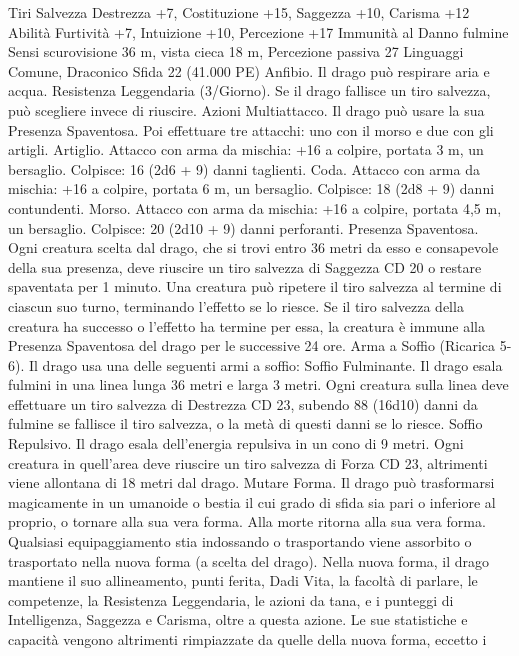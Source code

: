 \begin{multicols}{2}
Tiri Salvezza Destrezza +7, Costituzione +15, Saggezza +10,
Carisma +12
Abilità Furtività +7, Intuizione +10, Percezione +17
Immunità al Danno fulmine
Sensi scurovisione 36 m, vista cieca 18 m, Percezione passiva 27
Linguaggi Comune, Draconico
Sfida 22 (41.000 PE)
Anfibio. Il drago può respirare aria e acqua.
Resistenza Leggendaria (3/Giorno). Se il drago fallisce un tiro
salvezza, può scegliere invece di riuscire.
Azioni
Multiattacco. Il drago può usare la sua Presenza Spaventosa. Poi
effettuare tre attacchi: uno con il morso e due con gli artigli.
Artiglio. Attacco con arma da mischia: +16 a colpire, portata 3
m, un bersaglio.
Colpisce: 16 (2d6 + 9) danni taglienti.
Coda. Attacco con arma da mischia: +16 a colpire, portata 6 m,
un bersaglio.
Colpisce: 18 (2d8 + 9) danni contundenti.
Morso. Attacco con arma da mischia: +16 a colpire, portata 4,5
m, un bersaglio.
Colpisce: 20 (2d10 + 9) danni perforanti.
Presenza Spaventosa. Ogni creatura scelta dal drago, che si trovi
entro 36 metri da esso e consapevole della sua presenza, deve
riuscire un tiro salvezza di Saggezza CD 20 o restare spaventata per
1 minuto. Una creatura può ripetere il tiro salvezza al termine di
ciascun suo turno, terminando l’effetto se lo riesce. Se il tiro salvezza
della creatura ha successo o l’effetto ha termine per essa, la creatura è
immune alla Presenza Spaventosa del drago per le successive 24 ore.
Arma a Soffio (Ricarica 5-6). Il drago usa una delle seguenti armi
a soffio:
Soffio Fulminante. Il drago esala fulmini in una linea lunga 36 metri
e larga 3 metri. Ogni creatura sulla linea deve effettuare un tiro
salvezza di Destrezza CD 23, subendo 88 (16d10) danni da fulmine
se fallisce il tiro salvezza, o la metà di questi danni se lo riesce.
Soffio Repulsivo. Il drago esala dell’energia repulsiva in un cono di 9
metri. Ogni creatura in quell’area deve riuscire un tiro salvezza di
Forza CD 23, altrimenti viene allontana di 18 metri dal drago.
Mutare Forma. Il drago può trasformarsi magicamente in un
umanoide o bestia il cui grado di sfida sia pari o inferiore al proprio,
o tornare alla sua vera forma. Alla morte ritorna alla sua vera forma.
Qualsiasi equipaggiamento stia indossando o trasportando viene
assorbito o trasportato nella nuova forma (a scelta del drago).
Nella nuova forma, il drago mantiene il suo allineamento, punti
ferita, Dadi Vita, la facoltà di parlare, le competenze, la Resistenza
Leggendaria, le azioni da tana, e i punteggi di Intelligenza, Saggezza
e Carisma, oltre a questa azione. Le sue statistiche e capacità
vengono altrimenti rimpiazzate da quelle della nuova forma, eccetto i

\end{multicols}
